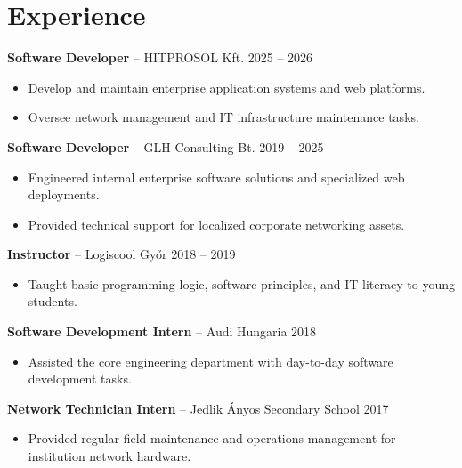 \documentclass[11pt,a4paper]{article}
\begin{document}
\section{Experience}

\textbf{Software Developer} -- HITPROSOL Kft. \hfill 2025 -- 2026
\begin{itemize}[noitemsep,topsep=2pt,leftmargin=0.15in]
    \item Develop and maintain enterprise application systems and web platforms.
    \item Oversee network management and IT infrastructure maintenance tasks.
\end{itemize}

\vspace{4pt}
\textbf{Software Developer} -- GLH Consulting Bt. \hfill 2019 -- 2025
\begin{itemize}[noitemsep,topsep=2pt,leftmargin=0.15in]
    \item Engineered internal enterprise software solutions and specialized web deployments.
    \item Provided technical support for localized corporate networking assets.
\end{itemize}

\vspace{4pt}
\textbf{Instructor} -- Logiscool Győr \hfill 2018 -- 2019
\begin{itemize}[noitemsep,topsep=2pt,leftmargin=0.15in]
    \item Taught basic programming logic, software principles, and IT literacy to young students.
\end{itemize}

\vspace{4pt}
\textbf{Software Development Intern} -- Audi Hungaria \hfill 2018
\begin{itemize}[noitemsep,topsep=2pt,leftmargin=0.15in]
    \item Assisted the core engineering department with day-to-day software development tasks.
\end{itemize}

\vspace{4pt}
\textbf{Network Technician Intern} -- Jedlik Ányos Secondary School \hfill 2017
\begin{itemize}[noitemsep,topsep=2pt,leftmargin=0.15in]
    \item Provided regular field maintenance and operations management for institution network hardware.
\end{itemize}
\end{document}
